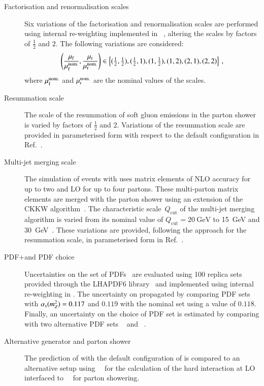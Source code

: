 \begin{description}

\item[Factorisation and renormalisation scales] Six variations of the
  factorisation and renormalisation scales are performed using
  internal re-weighting implemented in
  \SHERPA[2.2.1]~\cite{Bothmann:2019yzt}, altering the scales by
  factors of $\frac{1}{2}$ and $2$. The following variations are
  considered:
  \begin{align*}
    \left( \frac{\mu_\mathrm{f}}{\mu_\mathrm{f}^{\text{nom.}}}, \frac{\mu_\mathrm{r}}{\mu_\mathrm{r}^{\text{nom.}}} \right) \in
    \left\{ (\tfrac{1}{2}, \tfrac{1}{2}), (\tfrac{1}{2}, 1), (1, \tfrac{1}{2}), (1, 2), (2, 1), (2, 2) \right\} \,\text{,}
  \end{align*}
  where $\mu_\mathrm{f}^{\text{nom.}}$ and $\mu_\mathrm{r}^{\text{nom.}}$ are the nominal
  values of the scales.

\item[Resummation scale] The scale of the resummation of soft gluon
  emissions in the \SHERPA parton shower is varied by factors of
  $\frac{1}{2}$ and 2. Variations of the resummation scale are
  provided in parameterised form with respect to the default \SHERPA
  configuration in Ref.~\cite{anders:2017}.

\item[Multi-jet merging scale] The simulation of \Zjets events with
  \SHERPA[2.2.1] uses matrix elements of NLO accuracy for up to two
  and LO for up to four partons. These multi-parton matrix elements
  are merged with the parton shower using an extension of the CKKW
  algorithm~\cite{Catani:2001cc,Hoeche:2009rj,Hoeche:2012yf}. The
  characteristic scale~$Q_{\text{cut}}$ of the multi-jet merging
  algorithm is varied from its nominal value of
  $Q_{\text{cut}} = \SI{20}{\GeV}$ to \SI{15}{\GeV} and
  \SI{30}{\GeV}~\cite{anders:2017}. These variations are provided,
  following the approach for the resummation scale, in parameterised
  form in Ref.~\cite{anders:2017}.

\item[PDF+\alphas and PDF choice] Uncertainties on the \NNPDF[3.0nnlo]
  set of PDFs~\cite{Ball:2014uwa} are evaluated using 100 replica sets
  provided through the \textsc{LHAPDF6} library~\cite{Buckley:2014ana}
  and implemented using internal re-weighting in \SHERPA. The
  uncertainty on \alphas propagated by comparing \NNPDF[3.0nnlo] PDF
  sets with $\alpha_{\text{s}}(m_{Z}^2) = 0.117$ and $0.119$ with the nominal set
  using a value of $0.118$. Finally, an uncertainty on the choice of
  PDF set is estimated by comparing with two alternative PDF sets
  \MMHT[nnlo68cl]~\cite{Harland-Lang:2014zoa} and
  \CT[14nnlo]~\cite{Dulat:2015mca}.

\item[Alternative generator and parton shower] The prediction of
  \Zjets with the default configuration of \SHERPA[2.2.1] is compared
  to an alternative setup using~\MGNLO[2.2.2]~\cite{Alwall:2014hca}
  for the calculation of the hard interaction at LO interfaced
  to~\PYTHIA[8.186]~\cite{Sjostrand:2007gs} for parton showering.

\end{description}
